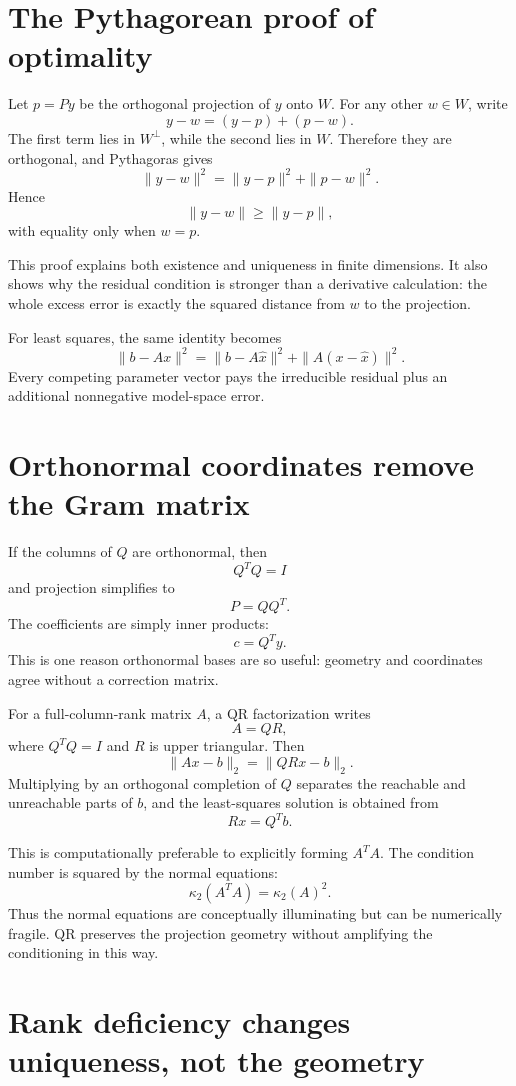\section{The Pythagorean proof of optimality}

Let \(p=Py\) be the orthogonal projection of \(y\) onto \(W\).  For any other \(w\in W\), write
\[
  y-w=(y-p)+(p-w).
\]
The first term lies in \(W^\perp\), while the second lies in \(W\).  Therefore they are orthogonal, and Pythagoras gives
\[
  \|y-w\|^2
  =\|y-p\|^2+\|p-w\|^2.
\]
Hence
\[
  \|y-w\|\ge\|y-p\|,
\]
with equality only when \(w=p\).

This proof explains both existence and uniqueness in finite dimensions.  It also shows why the residual condition is stronger than a derivative calculation: the whole excess error is exactly the squared distance from \(w\) to the projection.

For least squares, the same identity becomes
\[
  \|b-Ax\|^2
  =\|b-A\widehat x\|^2
  +\|A(x-\widehat x)\|^2.
\]
Every competing parameter vector pays the irreducible residual plus an additional nonnegative model-space error.

\section{Orthonormal coordinates remove the Gram matrix}

If the columns of \(Q\) are orthonormal, then
\[
  Q^TQ=I
\]
and projection simplifies to
\[
  P=QQ^T.
\]
The coefficients are simply inner products:
\[
  c=Q^Ty.
\]
This is one reason orthonormal bases are so useful: geometry and coordinates agree without a correction matrix.

For a full-column-rank matrix \(A\), a QR factorization writes
\[
  A=QR,
\]
where \(Q^TQ=I\) and \(R\) is upper triangular.  Then
\[
  \|Ax-b\|_2
  =\|QRx-b\|_2.
\]
Multiplying by an orthogonal completion of \(Q\) separates the reachable and unreachable parts of \(b\), and the least-squares solution is obtained from
\[
  Rx=Q^Tb.
\]

This is computationally preferable to explicitly forming \(A^TA\).  The condition number is squared by the normal equations:
\[
  \kappa_2(A^TA)=\kappa_2(A)^2.
\]
Thus the normal equations are conceptually illuminating but can be numerically fragile.  QR preserves the projection geometry without amplifying the conditioning in this way.

\section{Rank deficiency changes uniqueness, not the geometry}

